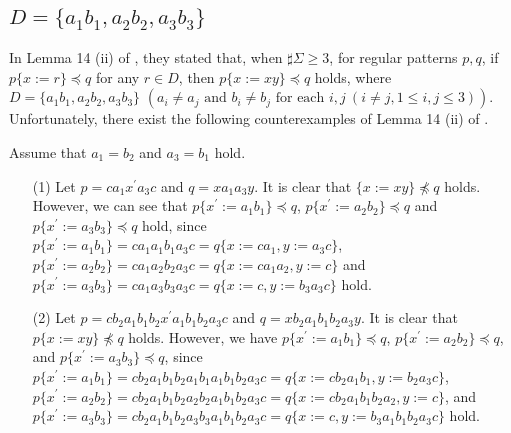 \subsection{$D = \{ a_{1}b_{1}, a_{2}b_{2}, a_{3}b_{3}\}$}\label{subsec:d3b}

In Lemma 14 (ii) of \cite{Sato1}, 
they stated that, when $\sharp \Sigma \geq 3$, for regular patterns $p,q$, if $p\{x:=r\}\preceq q$ for any $r\in D$, then $p\{x:=xy\} \preceq q$ holds, where 
$D = \{ a_{1}b_{1}, a_{2}b_{2}, a_{3}b_{3}\}$ $(a_{i} \ne a_{j} \mbox{ and } b_{i} \ne b_{j} \mbox{ for each } i,j~(i\ne j, 1\le i,j\le 3))$.
Unfortunately, there exist the following counterexamples of Lemma 14 (ii) of \cite{Sato1}.
\begin{ex}\label{CounterExample_Lemma14}
Assume that $a_1=b_2$ and $a_3=b_1$ hold.
  
\begin{itemize}
\item[(1)] 
Let $p=ca_1x^{\prime}a_3c$ and $q=xa_1a_3y$.
It is clear that $\{x:=xy\} \not\preceq q$ holds.
However, we can see that $p\{x^{\prime}:=a_1b_1\}\preceq q$, $p\{x^{\prime}:=a_2b_2\}\preceq q$ and $p\{x^{\prime}:=a_3b_3\}\preceq q$ hold, 
since
$p\{x^{\prime}:=a_1b_1\}=ca_1a_1b_1a_3c=q\{x:=ca_1,y:=a_3c\}$,
$p\{x^{\prime}:=a_2b_2\}=ca_1a_2b_2a_3c=q\{x:=ca_1a_2,y:=c\}$ and 
$p\{x^{\prime}:=a_3b_3\}=ca_1a_3b_3a_3c=q\{x:=c,y:=b_3a_3c\}$ hold.

\item[(2)] 
Let $p=cb_2a_1b_1b_2x^{\prime}a_1b_1b_2a_3c$ and $q=xb_2a_1b_1b_2a_3y$.
It is clear that $p\{x:=xy\} \not\preceq q$ holds.
However, we have $p\{x^{\prime}:=a_1b_1\}\preceq q$, $p\{x^{\prime}:=a_2b_2\} \preceq q$, and $p\{x^{\prime}:=a_3b_3\} \preceq q$, 
since  
$p\{x^{\prime}:=a_1b_1\}=cb_2a_1b_1b_2a_1b_1a_1b_1b_2a_3c=q\{x:=cb_2a_1b_1,y:=b_2a_3c\}$,
$p\{x^{\prime}:=a_2b_2\}=cb_2a_1b_1b_2a_2b_2a_1b_1b_2a_3c=q\{x:=cb_2a_1b_1b_2a_2,y:=c\}$,
and  $p\{x^{\prime}:=a_3b_3\}=cb_2a_1b_1b_2a_3b_3a_1b_1b_2a_3c=q\{x:=c,y:=b_3a_1b_1b_2a_3c\}$ hold.
\end{itemize}
\end{ex}

